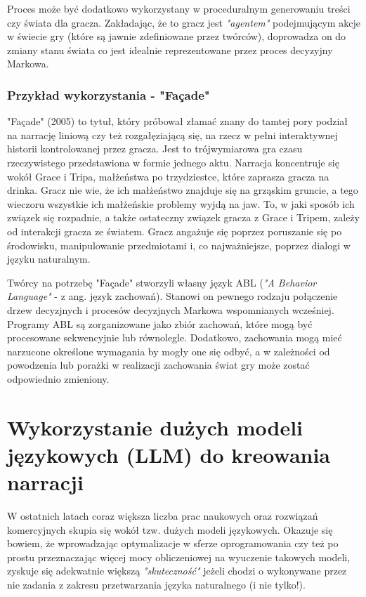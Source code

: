 Proces może być dodatkowo wykorzystany w proceduralnym generowaniu treści czy świata dla gracza.
Zakładając, że to gracz jest \textit{"agentem"} podejmującym akcje w świecie gry (które są jawnie
zdefiniowane przez twórców), doprowadza on do zmiany stanu świata co jest idealnie reprezentowane
przez proces decyzyjny Markowa\cite{automated_planning}.

\subsubsection*{Przykład wykorzystania - "Façade"}

"Façade" (2005) to tytuł, który próbował złamać znany do tamtej pory podział na narrację liniową czy też
rozgałęziającą się, na rzecz w pełni interaktywnej historii kontrolowanej przez gracza. Jest to
trójwymiarowa gra czasu rzeczywistego przedstawiona w formie jednego aktu. Narracja koncentruje się
wokół Grace i Tripa, małżeństwa po trzydziestce, które zaprasza gracza na drinka. Gracz nie wie, że ich
małżeństwo znajduje się na grząskim gruncie, a tego wieczoru wszystkie ich małżeńskie problemy wyjdą na
jaw. To, w jaki sposób ich związek się rozpadnie, a także ostateczny związek gracza z Grace i Tripem,
zależy od interakcji gracza ze światem. Gracz angażuje się poprzez poruszanie się po środowisku,
manipulowanie przedmiotami i, co najważniejsze, poprzez dialogi w języku naturalnym\cite{1024751}.

Twórcy na potrzebę "Façade" stworzyli własny język ABL (\textit{"A Behavior Language"} - z ang. język
zachowań). Stanowi on pewnego rodzaju połączenie drzew decyzjnych i procesów decyzjnych Markowa
wspomnianych wcześniej. Programy ABL są zorganizowane jako zbiór zachowań, które mogą być procesowane
sekwencyjnie lub równolegle. Dodatkowo, zachowania mogą mieć narzucone określone wymagania by
mogły one się odbyć, a w zależności od powodzenia lub porażki w realizacji zachowania świat gry
może zostać odpowiednio zmieniony.

\section{Wykorzystanie dużych modeli językowych (LLM) do kreowania narracji}\label{section:ch4_2}

W ostatnich latach coraz większa liczba prac naukowych oraz rozwiązań komercyjnych skupia się wokół
tzw. dużych modeli językowych. Okazuje się bowiem, że wprowadzając optymalizacje w sferze oprogramowania
czy też po prostu przeznaczając więcej mocy obliczeniowej na wyuczenie takowych modeli, zyskuje się
adekwatnie większą \textit{"skuteczność"} jeżeli chodzi o wykonywane przez nie zadania z zakresu
przetwarzania języka naturalnego (i nie tylko!).

